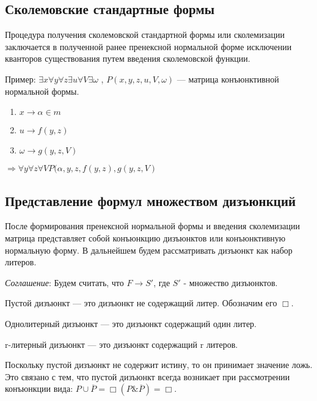 \documentclass[a4paper,12pt]{report}
\begin{document}
\subsection{Сколемовские стандартные формы}

	Процедура получения сколемовской стандартной формы или сколемизации
	заключается в полученной ранее пренексной нормальной форме исключении
	кванторов существования путем введения сколемовской функции.\par
	Пример: $\exists x \forall y \forall z \exists u \forall V \exists \omega$ ,
	$P(x,y,z,u,V,\omega)$ --- матрица конъюнктивной нормальной формы.\par

	\begin{enumerate}
		\item $x \to \alpha \in m$
		\item $u \to f(y,z)$
		\item $\omega \to g(y,z,V)$
	\end{enumerate}
	$\Rightarrow \forall y \forall z \forall V P(\alpha,y,z,f(y,z),g(y,z,V)$


\subsection{Представление формул множеством дизъюнкций}

	После формирования пренексной нормальной формы и введения сколемизации
	матрица представляет собой конъюнкцию дизъюнктов или конъюнктивную нормальную
	форму. В дальнейшем будем рассматривать дизъюнкт как набор литеров.\\ \par
	\textit{Соглашение}: Будем считать, что $F \to S'$, где $S'$ - множество
	дизъюнктов.\\ \par

	Пустой дизъюнкт --- это дизъюнкт не содержащий литер. Обозначим его
	$\Box$.\par
	Однолитерный дизъюнкт --- это дизъюнкт содержащий один литер.\par
	r-литерный дизъюнкт --- это дизъюнкт содержащий r литеров.\\ \par

	Поскольку пустой дизъюнкт не содержит истину, то он принимает значение ложь.
	Это связано с тем, что пустой дизъюнкт всегда возникает при рассмотрении
	конъюнкции вида: $P \cup \overline{P} = \Box(P \& \overline{P}) = \Box$.
	\\ \par
\end{document}
